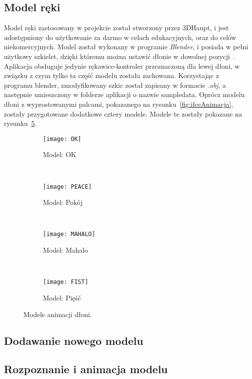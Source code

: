 	\subsection{Model ręki}
	\label{subsec:model}
	Model ręki zastosowany w projekcie został stworzony przez 3DHaupt, i jest udostępniony do użytkowanie za darmo w celach edukacyjnych, oraz do celów niekomercyjnych. Model został wykonany w programie \textit{Blender}, i posiada w pełni użytkowy szkielet, dzięki któremu można ustawić dłonie w dowolnej pozycji~\cite{hands}. Aplikacja obsługuje jedynie rękawice-kontroler przeznaczoną dla lewej dłoni, w związku z czym tylko ta część modelu została zachowana. Korzystając z programu blender, zmodyfikowany szkic został zapisany w formacie \textit{.obj}, a następnie umieszczony w folderze aplikacji o nazwie sampledata. Oprócz modelu dłoni z wyprostowanymi palcami, pokazanego na rysunku~\ref{fig:ifceAnimacja}, zostały przygotowane dodatkowe cztery modele. Modele te zostały pokazane na rysunku~\ref{fig:modele}.
\begin{figure}[h]
\centering
	\begin{subfigure}[b]{0.22\textwidth}
	\texttt{[image: OK]}
	\caption{Model: OK}
	\label{fig:modelOk}
	\end{subfigure}
	~
	\begin{subfigure}[b]{0.22\textwidth}
	\texttt{[image: PEACE]}
	\caption{Model: Pokój}
	\label{fig:modelPeace}
	\end{subfigure}
	~
	\begin{subfigure}[b]{0.22\textwidth}
	\texttt{[image: MAHALO]}
	\caption{Model: Mahalo}
	\label{fig:modelMahalo}
	\end{subfigure}
	~
	\begin{subfigure}[b]{0.22\textwidth}
	\texttt{[image: FIST]}
	\caption{Model: Pięść}
	\label{fig:modelFist}
	\end{subfigure}
\caption{Modele animacji dłoni.}
\label{fig:modele}
\end{figure}

	
	
	\subsection{Dodawanie nowego modelu}
	\label{subsec:nowyModel}
	
	
	
	\subsection{Rozpoznanie i animacja modelu}
	\label{subsec:rozpoznanie}
	

